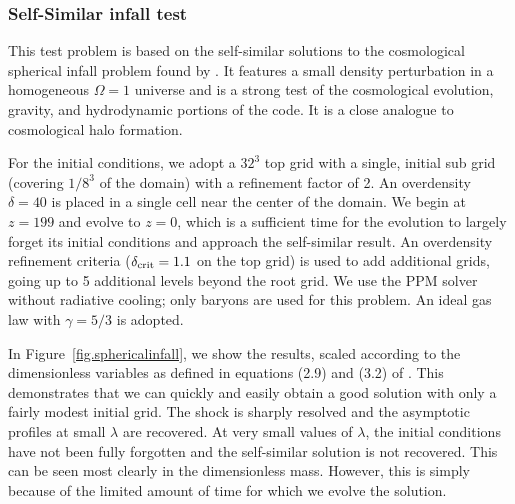 \subsubsection{Self-Similar infall test}
\label{sec.tests.infall}

This test problem is based on the self-similar solutions to the
cosmological spherical infall problem found
by \citet{Bertschinger1985}.  It features a small density perturbation
in a homogeneous $\Omega = 1$ universe and is a strong test of the
cosmological evolution, gravity, and hydrodynamic portions of the
code.  It is a close analogue to cosmological halo formation.

For the initial conditions, we adopt a $32^3$ top grid with a single,
initial sub grid (covering $1/8^3$ of the domain) with a refinement
factor of 2.  An overdensity $\delta = 40$ is placed in a single cell
near the center of the domain.  We begin at $z=199$ and evolve to
$z=0$, which is a sufficient time for the evolution to largely forget
its initial conditions and approach the self-similar result.  An
overdensity refinement criteria ($\delta_{\rm crit} = 1.1$ on the top
grid) is used to add additional grids, going up to 5 additional levels
beyond the root grid.  We use the PPM solver without radiative
cooling; only baryons are used for this problem.  An ideal gas law
with $\gamma = 5/3$ is adopted.

In Figure~\ref{fig.sphericalinfall}, we show the results, scaled
according to the dimensionless variables as defined in equations (2.9)
and (3.2) of \citet{Bertschinger1985}.  This demonstrates that we can
quickly and easily obtain a good solution with only a fairly modest
initial grid.  The shock is sharply resolved and the asymptotic
profiles at small $\lambda$ are recovered.  At very small values of
$\lambda$, the initial conditions have not been fully forgotten and
the self-similar solution is not recovered.  This can be seen most
clearly in the dimensionless mass.  However, this is simply because of
the limited amount of time for which we evolve the solution.


